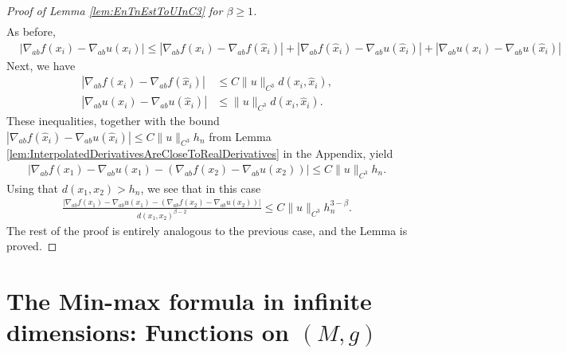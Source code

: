 \documentclass[11pt,reqno]{amsart}
\numberwithin{equation}{section}
\theoremstyle{plain}
\begin{document}
\begin{proof}[Proof of Lemma \ref{lem:EnTnEstToUInC3} for $\beta \geq 1$]
\begin{align*}
  \end{align*} 	  
  As before, 
  \begin{align*}
    &  |\nabla_{ab} f(x_i)-\nabla_{ab} u(x_i)| \leq |\nabla_{ab} f(x_i)-\nabla_{ab} f(\hat x_i)|+|\nabla_{ab} f(\hat x_i)-\nabla_{ab} u(\hat x_i)|+|\nabla_{ab} u(x_i)-\nabla_{ab} u(\hat x_i)| 
  \end{align*} 	  
  Next, we have 
  \begin{align*}
    |\nabla_{ab} f(x_i)-\nabla_{ab} f(\hat x_i)| & \leq C\|u\|_{C^3}d(x_i,\hat x_i),\\
    |\nabla_{ab} u(x_i)-\nabla_{ab} u(\hat x_i)| & \leq \|u\|_{C^3}d(x_i,\hat x_i).
  \end{align*}
  These inequalities, together with the bound $|\nabla_{ab} f(\hat x_i)-\nabla_{ab} u(\hat x_i)|\leq C\|u\|_{C^3}h_n$ from Lemma \ref{lem:InterpolatedDerivativesAreCloseToRealDerivatives} in the Appendix, yield
  \begin{align*}
    |\nabla_{ab} f(x_1)-\nabla_{ab} u(x_1)-(\nabla_{ab} f(x_2)-\nabla_{ab} u(x_2))| \leq C\|u\|_{C^3}h_n.	  
  \end{align*}
  Using that $d(x_1,x_2)>h_n$, we see that in this case
  \begin{align*}
    \frac{|\nabla_{ab} f(x_1)-\nabla_{ab} u(x_1)-(\nabla_{ab} f(x_2)-\nabla_{ab} u(x_2))|}{d(x_1,x_2)^{\beta-2}} \leq C\|u\|_{C^3}h_n^{3-\beta}.	  
  \end{align*}
  The rest of the proof is entirely analogous to the previous case, and the Lemma is proved.
\end{proof}




\section{The Min-max formula in infinite dimensions: Functions on $(M,g)$}\label{sec: Min-Max formula for M,g}
\end{document}
